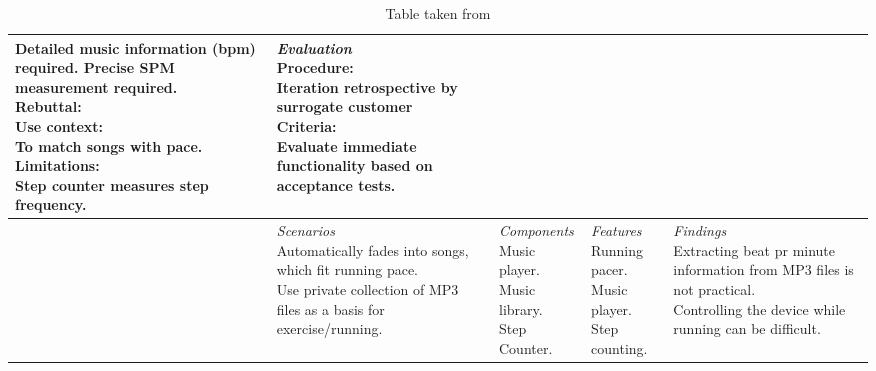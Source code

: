 \begin{table}
\begin{tabular}{l|l|l|l|l}
{		Detailed music information (bpm) required. Precise SPM measurement required. \newline
		Rebuttal: \newline
		Use context: \newline
		To match songs with pace. \newline
		Limitations: \newline
		Step counter measures step frequency.
	}
	& \parbox[t]{0.20\textwidth}{\small 
		\textit{Evaluation} \newline
		Procedure: \newline Iteration retrospective by surrogate customer \newline
		Criteria: \newline Evaluate immediate functionality based on acceptance tests.
	}\\ \hline
\parbox[t][3.5cm][c]{0.02\textwidth}{}
	& \parbox[t]{0.20\textwidth}{\small 
		\textit{Scenarios}\newline
		Automatically fades into songs, which fit running pace.\newline
		Use private collection of MP3 files as a basis for exercise/running.
	}
	& \parbox[t]{0.20\textwidth}{\small 
		\textit{Components}\newline
		Music player. \newline
		Music library. \newline
		Step Counter.
		
	}
	& \parbox[t]{0.20\textwidth}{\small 
		\textit{Features}\newline
		Running pacer.\newline
		Music player.\newline
		Step counting.
	}
	& \parbox[t]{0.20\textwidth}{\small 
		\textit{Findings} \newline
		Extracting beat pr minute information from MP3 files is not practical. \newline
		Controlling the device while running can be difficult.
	}\\ \hline     
\end{tabular}
\caption[Table caption text]{Table taken from }
\label{table:config1}
\end{table}